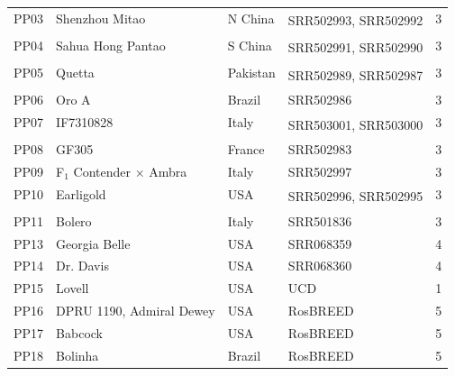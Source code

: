 \documentclass[12pt]{article}
\begin{document}
\begin{center}
\begin{longtable}{lllll}
                 PP03 &Shenzhou Mitao&N China &
		\multirow{2}{1cm}{SRR502993, SRR502992} &3\\
                 \\
                 PP04 &Sahua Hong Pantao &S China &
		\multirow{2}{1cm}{SRR502991, SRR502990} &3\\
                 \\
                 PP05 &Quetta &Pakistan &
		\multirow{2}{1cm}{SRR502989, SRR502987} &3\\
                 \\
                 PP06 &Oro A &Brazil &SRR502986 &3\\
                 PP07 &IF7310828 &Italy &
		\multirow{2}{1cm}{SRR503001, SRR503000} &3\\
                 \\
                 PP08 &GF305 &France &SRR502983 &3\\
		 PP09 &F$_{1}$ Contender $\times$ Ambra &Italy &SRR502997 &3\\
                 PP10 &Earligold &USA &
		\multirow{2}{1cm}{SRR502996, SRR502995} &3\\
		\\
                 PP11 &Bolero &Italy &SRR501836 &3\\
		 PP13 &Georgia Belle &USA &SRR068359 &4\\
                 PP14 &Dr. Davis &USA &SRR068360 &4\\
                 PP15 &Lovell &USA &UCD &1\\
                 PP16 &DPRU 1190, Admiral Dewey&USA &RosBREED &5\\
                 PP17 &Babcock &USA &RosBREED &5\\
                 PP18 &Bolinha &Brazil &RosBREED &5\\

\end{longtable}
\end{center}
\end{document}
